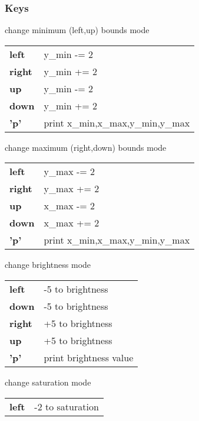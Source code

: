     \subsubsection{Keys}

    \begin{description} \itemindent=-15pt
        \item['l'] change minimum (left,up) bounds mode \\
            \begin{tabular}{ll}
                {\bf left } & y\_min -= 2 \\
                {\bf right} & y\_min += 2 \\
                {\bf up   } & y\_min -= 2 \\
                {\bf down } & y\_min += 2 \\
                {\bf 'p'  } & print x\_min,x\_max,y\_min,y\_max
            \end{tabular}
        \item['u'] change maximum (right,down) bounds mode \\
            \begin{tabular}{ll}
                {\bf left } & y\_max -= 2 \\
                {\bf right} & y\_max += 2 \\
                {\bf up   } & x\_max -= 2 \\
                {\bf down } & x\_max += 2 \\
                {\bf 'p'  } & print x\_min,x\_max,y\_min,y\_max 
            \end{tabular}
        \item['b']  change brightness mode \\
            \begin{tabular}{ll} 
                {\bf left } & -5 to brightness \\
                {\bf down } & -5 to brightness \\
                {\bf right} & +5 to brightness \\
                {\bf up   } & +5 to brightness \\
                {\bf 'p'  } & print brightness value 
            \end{tabular}
        \item['s'] change saturation mode \\
            \begin{tabular}{ll}
                {\bf left } & -2 to saturation \\

\end{tabular}
\end{description}
